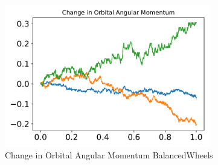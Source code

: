 \begin{figure}[htbp]\centerline{\includegraphics[width=0.80\textwidth]{AutoTeX/ChangeInOrbitalAngularMomentumBalancedWheels}}\caption{Change in Orbital Angular Momentum BalancedWheels}\label{fig:ChangeInOrbitalAngularMomentumBalancedWheels}\end{figure}